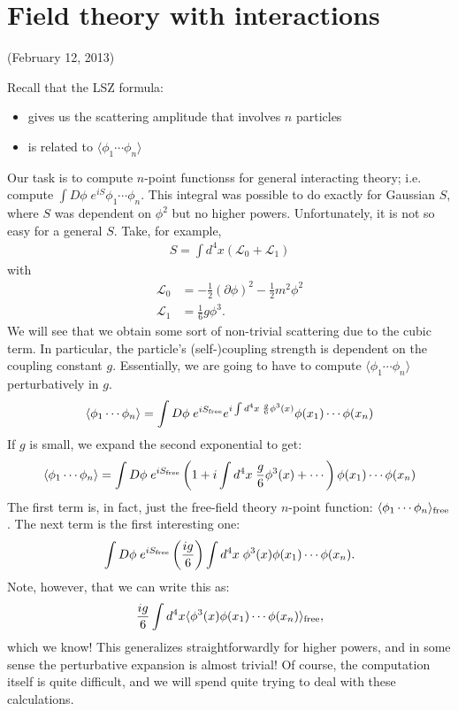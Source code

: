 \documentclass{../mathnotes}
\begin{document}
\section*{Field theory with interactions}

(February 12, 2013)

Recall that the LSZ formula:
\begin{itemize}
    \item gives us the scattering amplitude that involves $n$ particles
    \item is related to $\langle\phi_1\cdots\phi_n\rangle$
\end{itemize}
Our task is to compute $n$-point functionss for general interacting theory; i.e. compute $\int D\phi\; e^{iS}\phi_1\cdots\phi_n$.
This integral was possible to do exactly for Gaussian $S$, where $S$ was dependent on $\phi^2$ but no higher powers. Unfortunately,
it is not so easy for a general $S$. Take, for example, 
\begin{align*}
    S=\int d^4x \left( \mathcal{L}_0+\mathcal{L}_1 \right)
\end{align*}
with
\begin{align*}
    \mathcal{L}_0&=-\frac{1}{2}(\partial\phi)^2-\frac{1}{2}m^2\phi^2\\
    \mathcal{L}_1&=\frac{1}{6}g\phi^3.
\end{align*}
We will see that we obtain some sort of non-trivial scattering due to the cubic term. In particular, the particle's (self-)coupling
strength is dependent on the coupling constant $g$. Essentially, we are going to have to compute $\langle \phi_1\cdots\phi_n\rangle$
perturbatively in $g$.
\begin{align*}
    \langle\phi_1\cdots\phi_n\rangle=\int D\phi\;e^{iS_{\rm free}}e^{i\int d^4x\;\frac{g}{6}\phi^3(x)}\phi(x_1)\cdots\phi(x_n)
\end{align*}
If $g$ is small, we expand the second exponential to get:
\begin{align*}
    \langle\phi_1\cdots\phi_n\rangle=\int D\phi\;e^{iS_{\rm free}}\left(1+i\int d^4x\;\frac{g}{6}\phi^3(x)+\cdots\right)\phi(x_1)\cdots\phi(x_n)
\end{align*}
The first term is, in fact, just the free-field theory $n$-point function: $\langle\phi_1\cdots\phi_n\rangle_{\rm free}$. The next term
is the first interesting one:
\begin{align*}
    \int D\phi\;e^{iS_{\rm free}}\left( \frac{ig}{6} \right)\int d^4x\;\phi^3(x)\phi(x_1)\cdots\phi(x_n).
\end{align*}
Note, however, that we can write this as:
\begin{align*}
    \frac{ig}{6}\int d^4x \langle\phi^3(x)\phi(x_1)\cdots\phi(x_n)\rangle_{\rm free},
\end{align*}
which we know! This generalizes straightforwardly for higher powers, and in some sense the perturbative expansion is almost trivial!
Of course, the computation itself is quite difficult, and we will spend quite trying to deal with these calculations.
\end{document}
